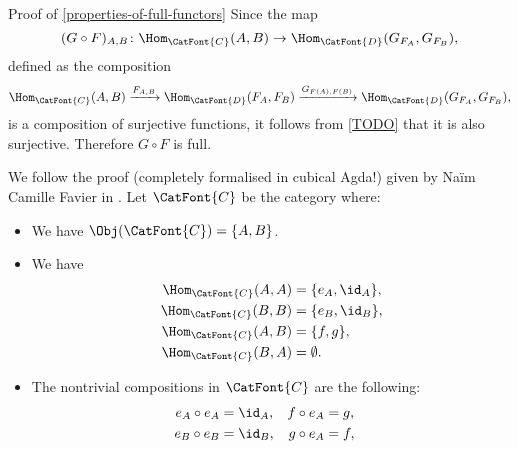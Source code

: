 \begin{Proof}{Proof of \cref{properties-of-full-functors}}%
    Since the map
    \[
        (G\circ F)_{A,B}
        \colon
        \Hom_{\CatFont{C}}(A,B)
        \to
        \Hom_{\CatFont{D}}(G_{F_{A}},G_{F_{B}}),%
    \]%
    defined as the composition
    \[
        \Hom_{\CatFont{C}}(A,B)%
        \xrightarrow{F_{A,B}}%
        \Hom_{\CatFont{D}}(F_{A},F_{B})%
        \xrightarrow{G_{F(A),F(B)}}%
        \Hom_{\CatFont{D}}(G_{F_{A}},G_{F_{B}}),%
    \]%
    is a composition of surjective functions, it follows from \cref{TODO} that it is also surjective. Therefore $G\circ F$ is full.

    We follow the proof (completely formalised in cubical Agda!) given by Naïm Camille Favier in \cite{favier:postcompose-not-full}. Let $\CatFont{C}$ be the category where:
    \begin{itemize}
        \item{}We have $\Obj(\CatFont{C})=\{A,B\}$.
        \item{}We have
            \begin{align*}
                \Hom_{\CatFont{C}}(A,A) &= \{e_{A},\id_{A}\},\\
                \Hom_{\CatFont{C}}(B,B) &= \{e_{B},\id_{B}\},\\
                \Hom_{\CatFont{C}}(A,B) &= \{f,g\},\\
                \Hom_{\CatFont{C}}(B,A) &= \emptyset.
            \end{align*}
        \item{}The nontrivial compositions in $\CatFont{C}$ are the following:
            \[
                \begin{aligned}
                    e_{A}\circ e_{A} &= \id_{A},\\
                    e_{B}\circ e_{B} &= \id_{B},
                \end{aligned}
                \quad
                \begin{aligned}
                    f\circ e_{A}     &= g,\\
                    g\circ e_{A}     &= f,
                \end{aligned}
                \quad
                \begin{aligned}

\end{aligned}\]
\end{itemize}
\end{Proof}
